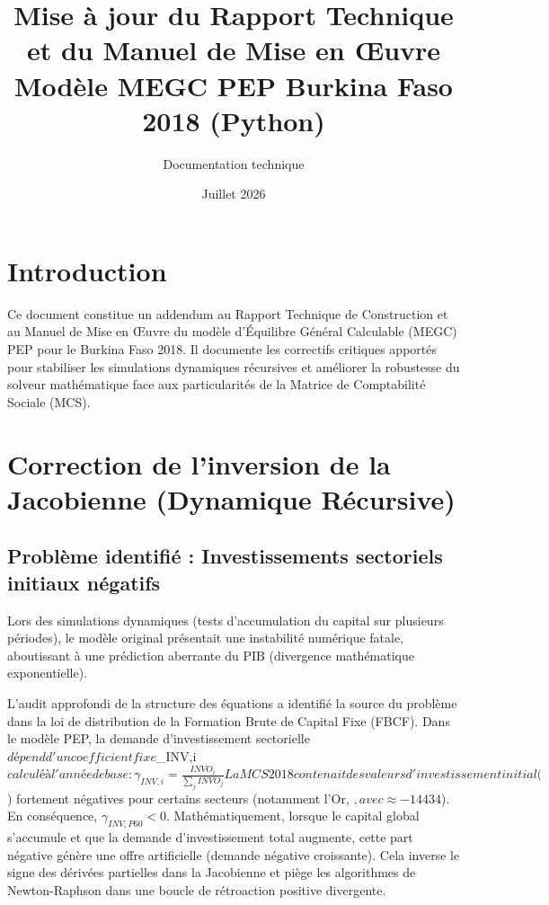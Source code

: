 \documentclass[11pt,a4paper]{article}
\title{Mise à jour du Rapport Technique et du Manuel de Mise en Œuvre \\ \large Modèle MEGC PEP Burkina Faso 2018 (Python)}
\author{Documentation technique}
\date{Juillet 2026}
\begin{document}
\maketitle

\section{Introduction}
Ce document constitue un addendum au Rapport Technique de Construction et au Manuel de Mise en Œuvre du modèle d'Équilibre Général Calculable (MEGC) PEP pour le Burkina Faso 2018. Il documente les correctifs critiques apportés pour stabiliser les simulations dynamiques récursives et améliorer la robustesse du solveur mathématique face aux particularités de la Matrice de Comptabilité Sociale (MCS).

\section{Correction de l'inversion de la Jacobienne (Dynamique Récursive)}

\subsection{Problème identifié : Investissements sectoriels initiaux négatifs}
Lors des simulations dynamiques (tests d'accumulation du capital sur plusieurs périodes), le modèle original présentait une instabilité numérique fatale, aboutissant à une prédiction aberrante du PIB (divergence mathématique exponentielle).

L'audit approfondi de la structure des équations a identifié la source du problème dans la loi de distribution de la Formation Brute de Capital Fixe (FBCF). Dans le modèle PEP, la demande d'investissement sectorielle $ dépend d'un coefficient fixe $\gamma_{INV,i}$ calculé à l'année de base :
\begin{equation}
    \gamma_{INV,i} = \frac{INVO_i}{\sum_j INVO_j}
\end{equation}

La MCS 2018 contenait des valeurs d'investissement initial ($) fortement négatives pour certains secteurs (notamment l'Or, $, avec  \approx -14434$). En conséquence, $\gamma_{INV, P60} < 0$.
Mathématiquement, lorsque le capital global s'accumule et que la demande d'investissement total augmente, cette part négative génère une offre artificielle (demande négative croissante). Cela inverse le signe des dérivées partielles dans la Jacobienne et piège les algorithmes de Newton-Raphson dans une boucle de rétroaction positive divergente.
\end{document}
